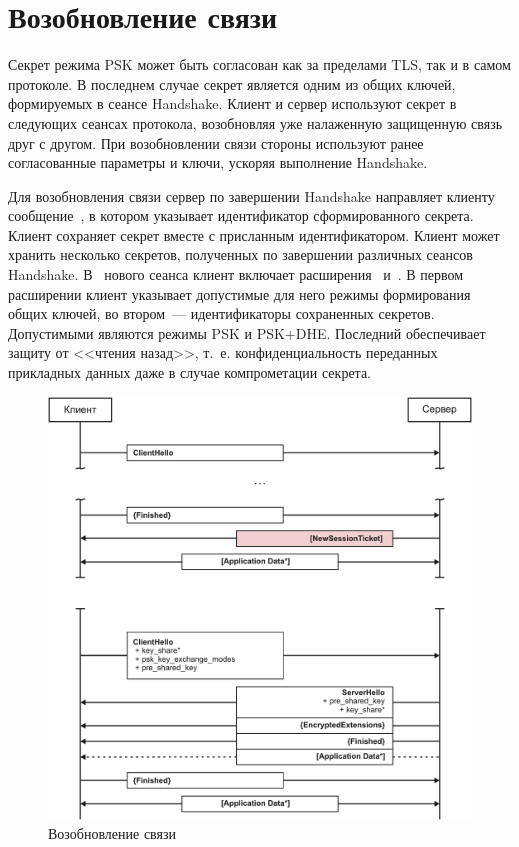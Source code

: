 \section{Возобновление связи}\label{COMMON.Resume} 

Секрет режима PSK может быть согласован как за пределами TLS, так и в 
самом протоколе. В последнем случае секрет является одним из общих ключей, 
формируемых в сеансе Handshake. Клиент и сервер используют секрет в следующих 
сеансах протокола, возобновляя уже налаженную защищенную связь друг с другом. 
При возобновлении связи стороны используют ранее согласованные параметры и 
ключи, ускоряя выполнение Handshake.

Для возобновления связи сервер по завершении Handshake направляет клиенту
сообщение~, в котором указывает
идентификатор сформированного секрета.
%
Клиент сохраняет секрет вместе с присланным идентификатором. Клиент может
хранить несколько секретов, полученных по завершении различных сеансов
Handshake.
%
В~ нового сеанса клиент включает
расширения~
и~. В первом расширении клиент указывает 
допустимые для него режимы формирования общих ключей, во втором~--- 
идентификаторы сохраненных секретов.
%
Допустимыми являются режимы PSK и PSK+DHE. Последний обеспечивает защиту от 
<<чтения назад>>, т.~е. конфиденциальность переданных прикладных данных даже в  
случае компрометации секрета.

\begin{figure}[hbt]
\begin{center}
\includegraphics[width=15cm]{../figs/Resume}
\end{center}
\caption{Возобновление связи}\label{Fig.COMMON.Resume}
\end{figure}


